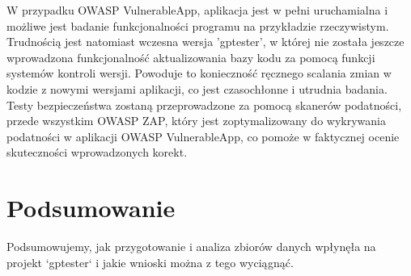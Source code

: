 W przypadku OWASP VulnerableApp, aplikacja jest w pełni uruchamialna i możliwe jest badanie funkcjonalności programu na przykładzie rzeczywistym. Trudnością jest natomiast wczesna wersja 'gptester', w której nie została jeszcze wprowadzona funkcjonalność aktualizowania bazy kodu za pomocą funkcji systemów kontroli wersji. Powoduje to konieczność ręcznego scalania zmian w kodzie z nowymi wersjami aplikacji, co jest czasochłonne i utrudnia badania. Testy bezpieczeństwa zostaną przeprowadzone za pomocą skanerów podatności, przede wszystkim OWASP ZAP, który jest zoptymalizowany do wykrywania podatności w aplikacji OWASP VulnerableApp, co pomoże w faktycznej ocenie skuteczności wprowadzonych korekt.


\section{Podsumowanie}
Podsumowujemy, jak przygotowanie i analiza zbiorów danych wpłynęła na projekt `gptester` i jakie wnioski można z tego wyciągnąć.

